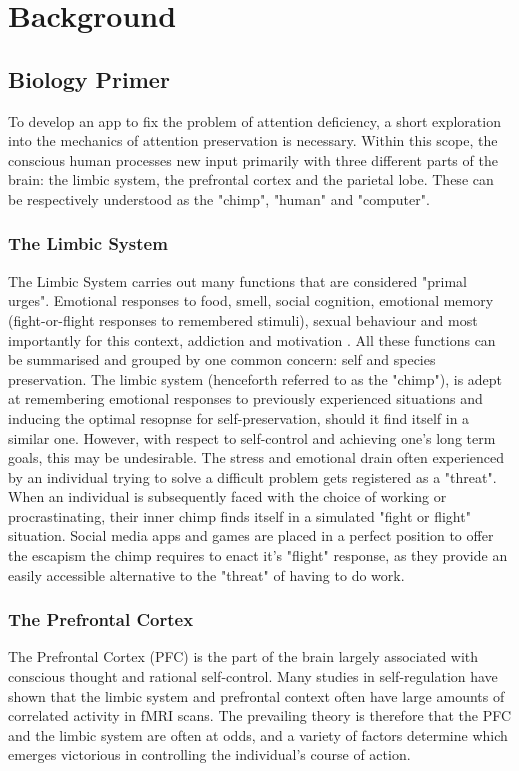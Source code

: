 \chapter{Background}
\label{ch:background}
\section{Biology Primer}
To develop an app to fix the problem of attention deficiency, a short exploration into the mechanics of attention preservation is necessary.
Within this scope, the conscious human processes new input primarily with three different parts of the brain: the limbic system, the prefrontal cortex and the parietal lobe. These can be respectively understood as the "chimp", "human" and "computer".

\subsection{The Limbic System}
The Limbic System carries out many functions that are considered "primal urges". Emotional responses to food, smell, social cognition, emotional memory (fight-or-flight responses to remembered stimuli), sexual behaviour and most importantly for this context, addiction and motivation \cite{rajmohan2007limbic}. All these functions can be summarised and grouped by one common concern: self and species preservation. The limbic system (henceforth referred to as the "chimp"), is adept at remembering emotional responses to previously experienced situations and inducing the optimal resopnse for self-preservation, should it find itself in a similar one. However, with respect to self-control and achieving one's long term goals, this may be undesirable. The stress and emotional drain often experienced by an individual trying to solve a difficult problem gets registered as a "threat". When an individual is subsequently faced with the choice of working or procrastinating, their inner chimp finds itself in a simulated "fight or flight" situation. Social media apps and games are placed in a perfect position to offer the escapism the chimp requires to enact it's "flight" response, as they provide an easily accessible alternative to the "threat" of having to do work.

\subsection{The Prefrontal Cortex}
The Prefrontal Cortex (PFC) is the part of the brain largely associated with conscious thought and rational self-control. Many studies in self-regulation have shown that the limbic system and prefrontal context often have large amounts of correlated activity in fMRI scans. The prevailing theory is therefore that the PFC and the limbic system are often at odds, and a variety of factors determine which emerges victorious in controlling the individual's course of action\cite{TODO}.

